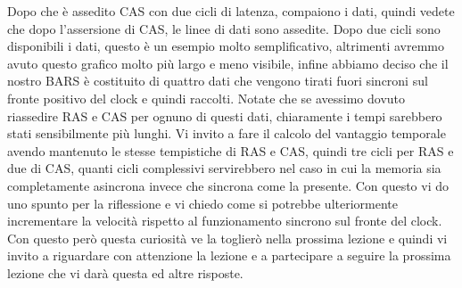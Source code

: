 Dopo che è assedito CAS con due cicli di latenza, compaiono i dati, quindi vedete che dopo l'assersione di CAS, le linee di dati sono assedite.
Dopo due cicli sono disponibili i dati, questo è un esempio molto semplificativo, altrimenti avremmo avuto questo grafico molto più largo e meno visibile, infine abbiamo deciso che il nostro BARS è costituito di quattro dati che vengono tirati fuori sincroni sul fronte positivo del clock e quindi raccolti.
Notate che se avessimo dovuto riassedire RAS e CAS per ognuno di questi dati, chiaramente i tempi sarebbero stati sensibilmente più lunghi.
Vi invito a fare il calcolo del vantaggio temporale avendo mantenuto le stesse tempistiche di RAS e CAS, quindi tre cicli per RAS e due di CAS, quanti cicli complessivi servirebbero nel caso in cui la memoria sia completamente asincrona invece che sincrona come la presente.
Con questo vi do uno spunto per la riflessione e vi chiedo come si potrebbe ulteriormente incrementare la velocità rispetto al funzionamento sincrono sul fronte del clock.
Con questo però questa curiosità ve la toglierò nella prossima lezione e quindi vi invito a riguardare con attenzione la lezione e a partecipare a seguire la prossima lezione che vi darà questa ed altre risposte.